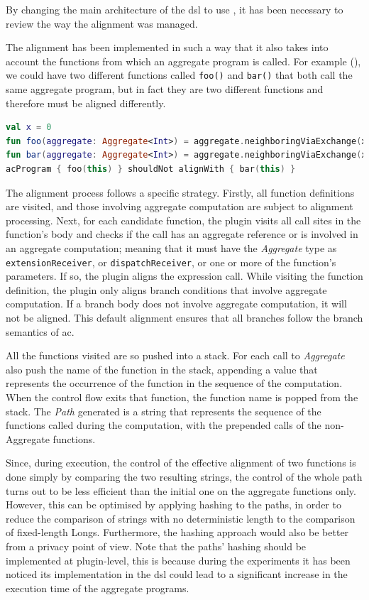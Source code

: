 By changing the main architecture of the \ac{dsl} to use \xc{}, it has been necessary to review the way the alignment was managed.

The alignment has been implemented in such a way that it also takes into account the functions from which an aggregate program is called.
For example (), we could have two different functions called \texttt{foo()} and \texttt{bar()} that both call the same aggregate program,
but in fact they are two different functions and therefore must be aligned differently.

\begin{lstlisting}[language=kt,label={lst:not-aligned}, caption={Example of two unaligned functions.}]
val x = 0
fun foo(aggregate: Aggregate<Int>) = aggregate.neighboringViaExchange(x)
fun bar(aggregate: Aggregate<Int>) = aggregate.neighboringViaExchange(x)
acProgram { foo(this) } shouldNot alignWith { bar(this) }
\end{lstlisting}

The alignment process follows a specific strategy.
Firstly, all function definitions are visited, and those involving aggregate computation are subject to alignment processing.
Next, for each candidate function, the plugin visits all call sites in the function's body and checks if the call has an
aggregate reference or is involved in an aggregate computation; meaning that it must have the \emph{Aggregate} type as
\texttt{extensionReceiver}, or \texttt{dispatchReceiver}, or one or more of the function's parameters.
If so, the plugin aligns the expression call.
While visiting the function definition, the plugin only aligns branch conditions that involve aggregate computation.
If a branch body does not involve aggregate computation, it will not be aligned.
This default alignment ensures that all branches follow the branch semantics of \ac{ac}.

All the functions visited are so pushed into a stack.
For each call to \emph{Aggregate} also push the name of the function in the stack, appending a value that represents the
occurrence of the function in the sequence of the computation.
When the control flow exits that function, the function name is popped from the stack.
The \emph{Path} generated is a string that represents the sequence of the functions called during the computation,
with the prepended calls of the non-Aggregate functions.

Since, during execution, the control of the effective alignment of two functions is done simply by comparing the two resulting strings,
the control of the whole path turns out to be less efficient than the initial one on the aggregate functions only.
However, this can be optimised by applying hashing to the paths, in order to reduce the comparison of strings with no deterministic length
to the comparison of fixed-length Longs.
Furthermore, the hashing approach would also be better from a privacy point of view.
Note that the paths' hashing should be implemented at plugin-level, this is because during the experiments it has been noticed
its implementation in the \ac{dsl} could lead to a significant increase in the execution time of the aggregate programs.


